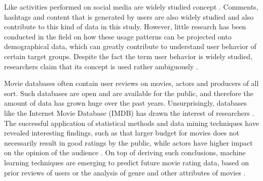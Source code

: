 Like activities performed on social media are widely studied concept \cite{bakhshi2014faces, jang2015noreciprocity, jang2016teensengagemorewithfewerphotos, ottoni2013ladies}. Comments, hashtags and content that is generated by users are also widely studied \cite{bakhshi2014faces, jang2016teensengagemorewithfewerphotos, hu2014we, bakhshi2014faces} and also contribute to this kind of data in this study. However, little research has been conducted in the field on how these usage patterns can be projected onto demographical data, which can greatly contribute to understand user behavior of certain target groups. Despite the fact the term user behavior is widely studied, researchers claim that its concept is used rather ambiguously \cite{waheed2017investigation}.

Movie databases often contain user reviews on movies, actors and producers of all sort. Such databases are open and are available for the public, and therefore the amount of data has grown huge over the past years. Unsurprisingly, databases like the Internet Movie Database (IMDB) has drawn the interest of researchers \cite{saraee2004data, kabinsingha2012movie, sumathi2013performance}. The successful application of statistical methods and data mining techniques have revealed interesting findings, such as that larger budget for movies does not necessarily result in good ratings by the public, while actors have higher impact on the opinion of the audience \cite{saraee2004data}. On top of deriving such conclusions, machine learning techniques are emerging to predict future movie rating data, based on prior reviews of users \cite{saraee2004data} or the analysis of genre and other attributes of movies \cite{kabinsingha2012movie}.

